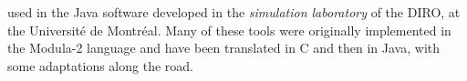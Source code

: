 used in the Java software developed in the {\em simulation laboratory\/}
of the DIRO, at the Universit\'e de Montr\'eal.
Many of these tools were originally implemented in the Modula-2 language
and have been translated in C and then in Java, with some adaptations
along the road.
